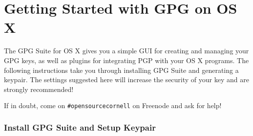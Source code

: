 \documentclass{article}
\begin{document}
\part*{Getting Started with GPG on OS X}
The GPG Suite for OS X gives you a simple GUI for creating and
managing your GPG keys, as well as plugins for integrating PGP with
your OS X programs.  The following instructions take you through
installing GPG Suite and generating a keypair.  The settings suggested
here will increase the security of your key and are strongly
recommended!

If in doubt, come on \texttt{\#opensourcecornell} on Freenode and ask
for help!

\section*{Install GPG Suite and Setup Keypair}
\end{document}
